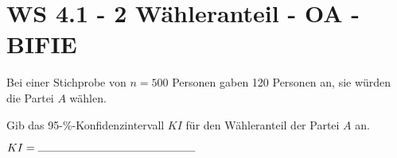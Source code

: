 \section{WS 4.1 - 2 Wähleranteil - OA - BIFIE}

\begin{beispiel}[WS 4.1]{1} %
Bei einer Stichprobe von $n = 500$ Personen gaben 120 Personen an, sie würden die Partei $A$
wählen. 	\leer

Gib das 95-\%-Konfidenzintervall $KI$ für den Wähleranteil der Partei $A$ an. \leer

$KI=\rule{5cm}{0.3pt}$	

\end{beispiel}	

